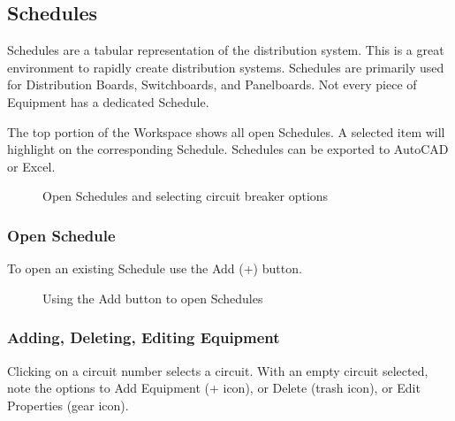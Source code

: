 \documentclass[letterpaper,10pt,english]{sphinxmanual}
\begin{document}
\subsection{Schedules}
\label{\detokenize{docs/userguide/index-user_guide:schedules}}\label{\detokenize{docs/userguide/buildingelectricalmodel/schedules/index-schedules:schedules}}
Schedules are a tabular representation of the distribution system.  This is a great environment to rapidly create distribution systems.  Schedules are primarily used for Distribution Boards, Switchboards, and Panelboards.  Not every piece of Equipment has a dedicated Schedule.

The top portion of the Workspace shows all open Schedules.  A selected item will highlight on the corresponding Schedule.  Schedules can be exported to AutoCAD or Excel.

\begin{figure}[H]
\centering
\capstart

\noindent{}
\caption{Open Schedules and selecting circuit breaker options}\label{\detokenize{docs/userguide/buildingelectricalmodel/schedules/index-schedules:id1}}\end{figure}


\subsubsection{Open Schedule}
\label{\detokenize{docs/userguide/buildingelectricalmodel/schedules/index-schedules:open-schedule}}\label{\detokenize{docs/userguide/buildingelectricalmodel/schedules/index-schedules::doc}}
To open an existing Schedule use the Add (+) button.

\begin{figure}[H]
\centering
\capstart

\noindent{}
\caption{Using the Add button to open Schedules}\label{\detokenize{docs/userguide/buildingelectricalmodel/schedules/index-schedules:id2}}\end{figure}

\ignorespaces 

\subsubsection{Adding, Deleting, Editing Equipment}
\label{\detokenize{docs/userguide/buildingelectricalmodel/schedules/index-schedules:adding-deleting-editing-equipment}}\label{\detokenize{docs/userguide/buildingelectricalmodel/schedules/index-schedules:schedules-copying-equipment}}\label{\detokenize{docs/userguide/buildingelectricalmodel/schedules/index-schedules:index-0}}
Clicking on a circuit number selects a circuit.  With an empty circuit selected, note the options to Add Equipment (+ icon), or Delete (trash icon), or Edit Properties (gear icon).
\end{document}
